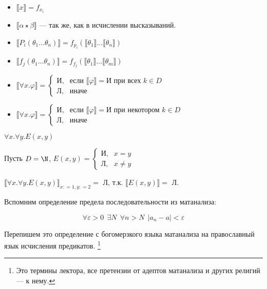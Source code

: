 \documentclass[12pt, a4paper, oneside]{book}
\begin{document}
\begin{itemize}
    \item \(\llbracket x \rrbracket = f_{x_i}\)
    \item \(\llbracket \alpha \star \beta \rrbracket\) --- так же, как в исчислении высказываний.
    \item \(\llbracket P_i(\theta_1 \dots \theta_n) \rrbracket = f_{p_i}(\llbracket \theta_1 \rrbracket \dots \llbracket \theta_n \rrbracket)\)
    \item \(\llbracket f_j(\theta_1 \dots \theta_n) \rrbracket = f_{f_j}(\llbracket \theta_1 \rrbracket \dots \llbracket \theta_m \rrbracket)\)
    \item \(\llbracket \forall x.\varphi \rrbracket = \begin{cases} \text{И}, & \text{если } \llbracket \varphi \rrbracket = \text{И} \text{ при всех } k\in D \\
              \text{Л}, & \text{иначе}
          \end{cases} \)
    \item \(\llbracket \forall x.\varphi \rrbracket = \begin{cases} \text{И}, & \text{если } \llbracket \varphi \rrbracket = \text{И} \text{ при некотором } k\in D \\
              \text{Л}, & \text{иначе}
          \end{cases} \)
\end{itemize}

\begin{example}
    \(\forall x.\forall y.E(x, y)\)

    Пусть \(D = \N\), \(E(x, y) = \begin{cases} \text{И}, & x = y \\ \text{Л}, & x \neq y \end{cases} \)

    \(\llbracket\forall x.\forall y.E(x, y)\rrbracket_{x: = 1, y: = 2} =\) Л, т.к. \(\llbracket E(x, y) \rrbracket =\) Л.
\end{example}

Вспомним определение предела последовательности из матанализа:

\[\forall \varepsilon > 0 \ \ \exists N \ \ \forall n > N \ \ |a_n - a| < \varepsilon\]

Перепишем это определение с богомерзкого языка матанализа на православный язык исчисления предикатов. \footnote{Это термины лектора, все претензии от адептов матанализа и других религий --- к нему.}
\end{document}
